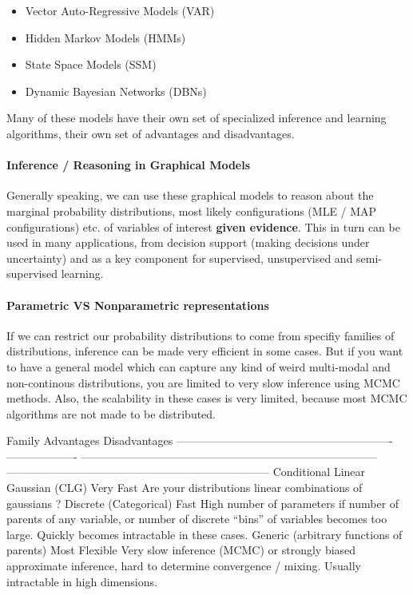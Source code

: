\begin{itemize}
\item
  Vector Auto-Regressive Models (VAR)
\item
  Hidden Markov Models (HMMs)
\item
  State Space Models (SSM)
\item
  Dynamic Bayesian Networks (DBNs)
\end{itemize}
Many of these models have their own set of specialized inference and
learning algorithms, their own set of advantages and disadvantages.

\paragraph{Inference / Reasoning in Graphical Models}

Generally speaking, we can use these graphical models to reason about
the marginal probability distributions, most likely configurations (MLE
/ MAP configurations) etc. of variables of interest \textbf{given
evidence}. This in turn can be used in many applications, from decision
support (making decisions under uncertainty) and as a key component for
supervised, unsupervised and semi- supervised learning.

\paragraph{Parametric VS Nonparametric representations}

If we can restrict our probability distributions to come from specifiy
families of distributions, inference can be made very efficient in some
cases. But if you want to have a general model which can capture any
kind of weird multi-modal and non-continous distributions, you are
limited to very slow inference using MCMC methods. Also, the scalability
in these cases is very limited, because most MCMC algorithms are not
made to be distributed.

\textbar{} Family \textbar{} Advantages \textbar{} Disadvantages
\textbar{}
\textbar{}------------------------------------------\textbar{}----------------\textbar{}-------------------
--------------------------------------------------------------------------------
-----------------------------------------------------------------------\textbar{}
\textbar{} Conditional Linear Gaussian (CLG) \textbar{} Very Fast
\textbar{} Are your distributions linear combinations of gaussians ?
\textbar{} \textbar{} Discrete (Categorical) \textbar{} Fast \textbar{}
High number of parameters if number of parents of any variable, or
number of discrete ``bins'' of variables becomes too large. Quickly
becomes intractable in these cases. \textbar{} \textbar{} Generic
(arbitrary functions of parents) \textbar{} Most Flexible \textbar{}
Very slow inference (MCMC) or strongly biased approximate inference,
hard to determine convergence / mixing. Usually intractable in high
dimensions. \textbar{}

